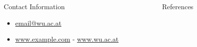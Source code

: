 \documentclass[final]{beamer}
\newlength{\sepmargin}
\newlength{\sepwid}
\newlength{\onecolwid}
\begin{document}
\begin{frame}[t]
  \begin{columns}[t] %
    
    \begin{column}{\sepmargin} \end{column}
    \begin{column}{\onecolwid} %
      
      \vspace*{-0.9cm}
      \begin{alertblock}{\large Contact Information}
        \vspace*{-0.5cm}
	\begin{footnotesize}
	  \begin{itemize}
	  \item \href{mailto:email@wu.ac.at}{email@wu.ac.at}
	  \item \href{http://www.example.com/}{www.example.com} - \href{www.wu.ac.at}{www.wu.ac.at}
	  \end{itemize}
	\end{footnotesize}	
	
      \end{alertblock}
    \end{column} %
    \begin{column}{\sepwid}\end{column} %
    \begin{column}{\onecolwid} %
      \begin{block}{\large References}
	\vspace*{-0.5cm}
        \nocite{*} %
	       {\footnotesize
		 }
      \end{block} 
    \end{column} %
    
    \begin{column}{\sepmargin}\end{column} %
    
  \end{columns} %


\end{frame} %
\end{document}
